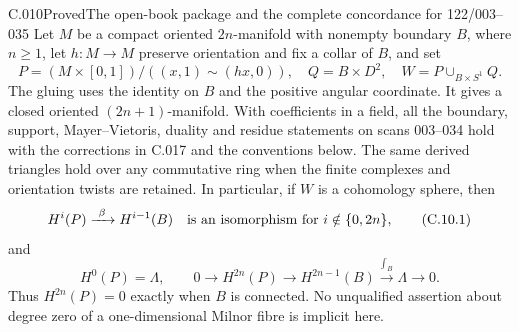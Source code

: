 \begin{saresult}{C.010}{Proved}{The open-book package and the complete concordance for 122/003--035}
Let $M$ be a compact oriented $2n$-manifold with nonempty boundary $B$,
where $n\geq1$, let $h:M\to M$ preserve orientation and fix a collar of $B$, and set
\[
 P=(M\times[0,1])/((x,1)\sim(hx,0)),\quad
 Q=B\times D^2,\quad W=P\cup_{B\times S^1}Q.
\]
The gluing uses the identity on $B$ and the positive angular coordinate.
It gives a closed oriented $(2n+1)$-manifold. With coefficients in a
field, all the boundary, support, Mayer--Vietoris, duality and residue
statements on scans 003--034 hold with the corrections in C.017 and
the conventions below. The same derived triangles hold over any
commutative ring when the finite complexes and orientation twists are
retained. In particular, if $W$ is a cohomology sphere, then
\[
 H^i(P)\xrightarrow{\ \beta\ }H^{i-1}(B)
 \quad\hbox{is an isomorphism for }i\notin\{0,2n\},
 \tag{C.10.1}
\]
and
\[
 H^0(P)=\Lambda,\qquad
 0\longrightarrow H^{2n}(P)\longrightarrow H^{2n-1}(B)
 \xrightarrow{\int_B}\Lambda\longrightarrow0.
 \tag{C.10.2}
\]
Thus $H^{2n}(P)=0$ exactly when $B$ is connected. No unqualified
assertion about degree zero of a one-dimensional Milnor fibre is
implicit here.
\end{saresult}
